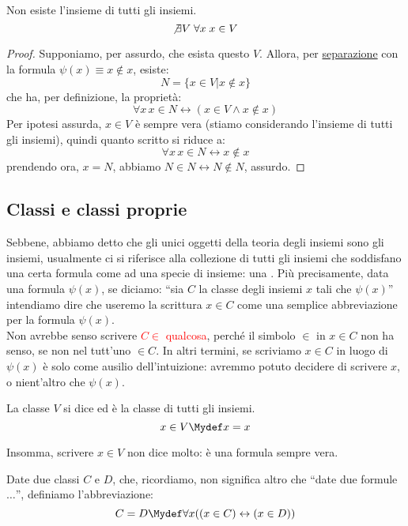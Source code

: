 \documentclass[11pt]{scrartcl}
\begin{document}
\begin{proposition}
Non esiste l'insieme di tutti gli insiemi.
\[ \not\exists V \; \forall x \; x \in V
	\]
\end{proposition}

\begin{proof}
Supponiamo, per assurdo, che esista questo $V$. Allora, per \hyperref[ax3]{separazione} con la formula $\psi (x) \equiv x \not \in x$, esiste:
\[ N = \{x \in V | x \not\in x\}
	\]
che ha, per definizione, la proprietà:
\[ \forall x \, x \in N \leftrightarrow (x \in V \land x \not \in x)
	\]
Per ipotesi assurda, $x \in V$ è sempre vera (stiamo considerando l'insieme di tutti gli insiemi), quindi quanto scritto si riduce a:
\[ \forall x \, x \in N \leftrightarrow x \not\in x
	\]
prendendo ora, $x = N$, abbiamo $N \in N \leftrightarrow N \not\in N$, assurdo.
\end{proof}

\subsection{Classi e classi proprie}
Sebbene, abbiamo detto che gli unici oggetti della teoria degli insiemi sono gli insiemi, usualmente ci si riferisce alla collezione di tutti gli insiemi 
che soddisfano una certa formula come ad una specie di insieme: una . Più precisamente, data una formula $\psi(x)$, se diciamo: ``sia $C$ la classe degli insiemi $x$ tali che $\psi(x)$''
intendiamo dire che useremo la scrittura $x \in C$ come una semplice abbreviazione per la formula $\psi(x)$. \\
Non avrebbe senso scrivere \textcolor{red}{$C \in$ qualcosa}, perché il simbolo $\in$ in $x \in C$ non ha senso, se non nel tutt'uno $\in C$. In altri termini, se scriviamo $x \in C$ in luogo di $\psi(x)$ è solo come ausilio dell'intuizione:
avremmo potuto decidere di scrivere $x$, o nient'altro che $\psi(x)$.

\begin{definition}
La classe $V$ si dice  ed è la classe di tutti gli insiemi.
\[ x \in V \Mydef x = x
	\]
\end{definition}

Insomma, scrivere $x \in V$ non dice molto: è una formula sempre vera.
\pagebreak
\begin{notation}
Date due classi $C$ e $D$, che, ricordiamo, non significa altro che ``date due formule$\ldots$'', definiamo l'abbreviazione:
$$ C = D \Mydef \forall x ((x \in C) \leftrightarrow (x \in D)) $$
\end{notation}
\end{document}
